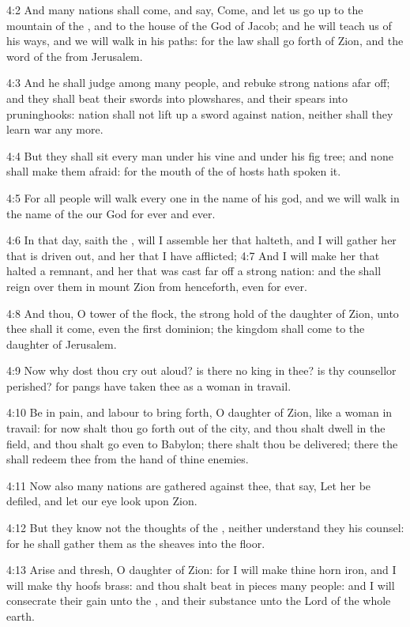 4:2 And many nations shall come, and say, Come, and let us go up to the mountain of the \LORD, and to the house of the God of Jacob; and he will teach us of his ways, and we will walk in his paths: for the law shall go forth of Zion, and the word of the \LORD from Jerusalem.

4:3 And he shall judge among many people, and rebuke strong nations afar off; and they shall beat their swords into plowshares, and their spears into pruninghooks: nation shall not lift up a sword against nation, neither shall they learn war any more.

4:4 But they shall sit every man under his vine and under his fig tree; and none shall make them afraid: for the mouth of the \LORD of hosts hath spoken it.

4:5 For all people will walk every one in the name of his god, and we will walk in the name of the \LORD our God for ever and ever.

4:6 In that day, saith the \LORD, will I assemble her that halteth, and I will gather her that is driven out, and her that I have afflicted; 4:7 And I will make her that halted a remnant, and her that was cast far off a strong nation: and the \LORD shall reign over them in mount Zion from henceforth, even for ever.

4:8 And thou, O tower of the flock, the strong hold of the daughter of Zion, unto thee shall it come, even the first dominion; the kingdom shall come to the daughter of Jerusalem.

4:9 Now why dost thou cry out aloud? is there no king in thee? is thy counsellor perished? for pangs have taken thee as a woman in travail.

4:10 Be in pain, and labour to bring forth, O daughter of Zion, like a woman in travail: for now shalt thou go forth out of the city, and thou shalt dwell in the field, and thou shalt go even to Babylon; there shalt thou be delivered; there the \LORD shall redeem thee from the hand of thine enemies.

4:11 Now also many nations are gathered against thee, that say, Let her be defiled, and let our eye look upon Zion.

4:12 But they know not the thoughts of the \LORD, neither understand they his counsel: for he shall gather them as the sheaves into the floor.

4:13 Arise and thresh, O daughter of Zion: for I will make thine horn iron, and I will make thy hoofs brass: and thou shalt beat in pieces many people: and I will consecrate their gain unto the \LORD, and their substance unto the Lord of the whole earth.

